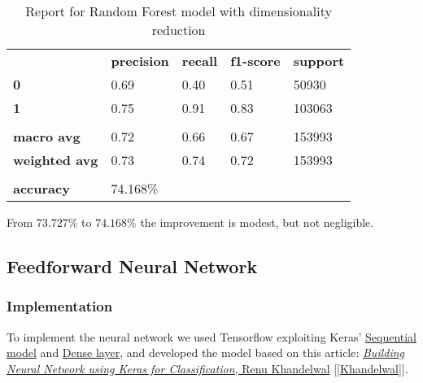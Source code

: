 \begin{table}[h]
    \centering
    \begin{tabular}{lllll}
        \rowcolor[HTML]{EEEEEE} 
        \cellcolor[HTML]{FBFBFB} & \textbf{precision} & \textbf{recall} & \textbf{f1-score} & \textbf{support} \\
        \rowcolor[HTML]{EEEEEE} 
        \textbf{0}               & 0.69               & 0.40            & 0.51              & 50930            \\
        \rowcolor[HTML]{EEEEEE} 
        \textbf{1}               & 0.75               & 0.91            & 0.83              & 103063           \\
        \rowcolor[HTML]{FBFBFB} 
        &                    &                 &                   &                  \\
        \rowcolor[HTML]{EEEEEE} 
        \textbf{macro avg}       & 0.72               & 0.66            & 0.67              & 153993           \\
        \rowcolor[HTML]{EEEEEE} 
        \textbf{weighted avg}    & 0.73               & 0.74            & 0.72              & 153993           \\
        \rowcolor[HTML]{FBFBFB} 
        &                    &                 &                   &                  \\
        \rowcolor[HTML]{EEEEEE} 
        \textbf{accuracy}        & \multicolumn{4}{l}{\cellcolor[HTML]{EEEEEE}74.168\%}                         
    \end{tabular}
    \caption{Report for Random Forest model with dimensionality reduction}
    \label{tab:rf-res-1}
\end{table}

From $73.727\%$ to $74.168\%$ the improvement is modest, but not negligible.


\newpage
\subsection{Feedforward Neural Network}\label{sec:nn}

\subsubsection{Implementation}

To implement the neural network we used Tensorflow exploiting Keras' \href{https://www.tensorflow.org/api_docs/python/tf/keras/Sequential}{Sequential model} and \href{https://www.tensorflow.org/api_docs/python/tf/keras/layers/Dense}{Dense layer}, and developed the model based on this article: \href{https://medium.com/datadriveninvestor/building-neural-network-using-keras-for-classification-3a3656c726c1}{\textit{Building Neural Network using Keras for Classification}, Renu Khandelwal} [\ref{Khandelwal}].


